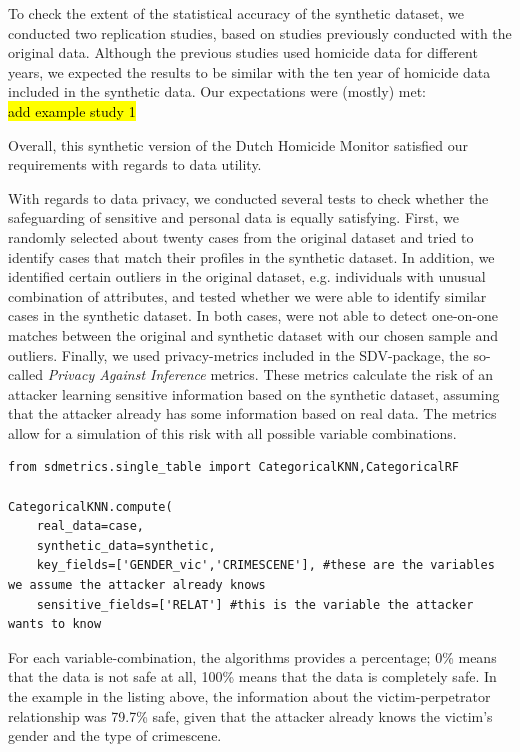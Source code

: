 To check the extent of the statistical accuracy of the synthetic dataset, we conducted two replication studies, based on studies previously conducted with the original data. Although the previous studies used homicide data for different years, we expected the results to be similar with the ten year of homicide data included in the synthetic data. Our expectations were (mostly) met: \\
\hl{add example study 1}

Overall, this synthetic version of the Dutch Homicide Monitor satisfied our requirements with regards to data utility.

With regards to data privacy, we conducted several tests to check whether the safeguarding of sensitive and personal data is equally satisfying. First, we randomly selected about twenty cases from the original dataset and tried to identify cases that match their profiles in the synthetic dataset. In addition, we identified certain outliers in the original dataset, e.g. individuals with unusual combination of attributes, and tested whether we were able to identify similar cases in the synthetic dataset.
In both cases, were not able to detect one-on-one matches between the original and synthetic dataset with our chosen sample and outliers. Finally, we used privacy-metrics included in the SDV-package, the so-called \textit{Privacy Against Inference} metrics. These metrics calculate the risk of an attacker learning sensitive information based on the synthetic dataset, assuming that the attacker already has some information based on real data. The metrics allow for a simulation of this risk with all possible variable combinations.

\vspace{10pt}
\begin{lstlisting}[caption={SDV privacy metrics example}, label={lst:gen_first}]
from sdmetrics.single_table import CategoricalKNN,CategoricalRF

CategoricalKNN.compute(
    real_data=case,
    synthetic_data=synthetic,
    key_fields=['GENDER_vic','CRIMESCENE'], #these are the variables we assume the attacker already knows
    sensitive_fields=['RELAT'] #this is the variable the attacker wants to know
\end{lstlisting}
\vspace{10pt}

For each variable-combination, the algorithms provides a percentage; 0\% means that the data is not safe at all, 100\% means that the data is completely safe. In the example in the listing above, the information about the victim-perpetrator relationship was 79.7\% safe, given that the attacker already knows the victim's gender and the type of crimescene.

